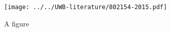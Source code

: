 \documentclass{article}
\begin{document}
\lipsum[1]
\begin{figure}
    \texttt{[image: ../../UWB-literature/802154-2015.pdf]}\caption{A figure}
\end{figure}
\end{document}
